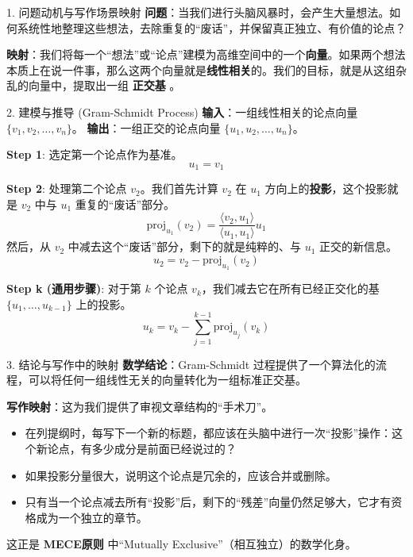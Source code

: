 \documentclass[11pt, a4paper]{ctexart}
\newcommand{\lowfreq}[1]{%
	{\Large\bfseries\color{red!60!black} #1}%
}
\begin{document}
	\begin{mathbox}{1. 问题动机与写作场景映射}
		\textbf{问题}：当我们进行头脑风暴时，会产生大量想法。如何系统性地整理这些想法，去除重复的“废话”，并保留真正独立、有价值的论点？
		
		\textbf{映射}：我们将每一个“想法”或“论点”建模为高维空间中的一个\textbf{向量}。如果两个想法本质上在说一件事，那么这两个向量就是\textbf{线性相关}的。我们的目标，就是从这组杂乱的向量中，提取出一组\lowfreq{正交基}。
	\end{mathbox}
	
	\begin{mathbox}{2. 建模与推导 (Gram-Schmidt Process)}
		\textbf{输入}：一组线性相关的论点向量 $\{v_1, v_2, \dots, v_n\}$。
		\textbf{输出}：一组正交的论点向量 $\{u_1, u_2, \dots, u_n\}$。
		
		\textbf{Step 1}: 选定第一个论点作为基准。
		$$ u_1 = v_1 $$
		
		\textbf{Step 2}: 处理第二个论点 $v_2$。我们首先计算 $v_2$ 在 $u_1$ 方向上的\textbf{投影}，这个投影就是 $v_2$ 中与 $u_1$ 重复的“废话”部分。
		$$ \text{proj}_{u_1}(v_2) = \frac{\langle v_2, u_1 \rangle}{\langle u_1, u_1 \rangle} u_1 $$
		然后，从 $v_2$ 中减去这个“废话”部分，剩下的就是纯粹的、与 $u_1$ 正交的新信息。
		$$ u_2 = v_2 - \text{proj}_{u_1}(v_2) $$
		
		\textbf{Step k (通用步骤)}: 对于第 $k$ 个论点 $v_k$，我们减去它在所有已经正交化的基 $\{u_1, \dots, u_{k-1}\}$ 上的投影。
		$$ u_k = v_k - \sum_{j=1}^{k-1} \text{proj}_{u_j}(v_k) $$
	\end{mathbox}
	
	\begin{mathbox}{3. 结论与写作中的映射}
		\textbf{数学结论}：Gram-Schmidt 过程提供了一个算法化的流程，可以将任何一组线性无关的向量转化为一组标准正交基。
		
		\textbf{写作映射}：这为我们提供了审视文章结构的“手术刀”。
		\begin{itemize}
			\item 在列提纲时，每写下一个新的标题，都应该在头脑中进行一次“投影”操作：这个新论点，有多少成分是前面已经说过的？
			\item 如果投影分量很大，说明这个论点是冗余的，应该合并或删除。
			\item 只有当一个论点减去所有“投影”后，剩下的“残差”向量仍然足够大，它才有资格成为一个独立的章节。
		\end{itemize}
		这正是 \lowfreq{MECE原则} 中“Mutually Exclusive”（相互独立）的数学化身。
	\end{mathbox}
	
\end{document}
